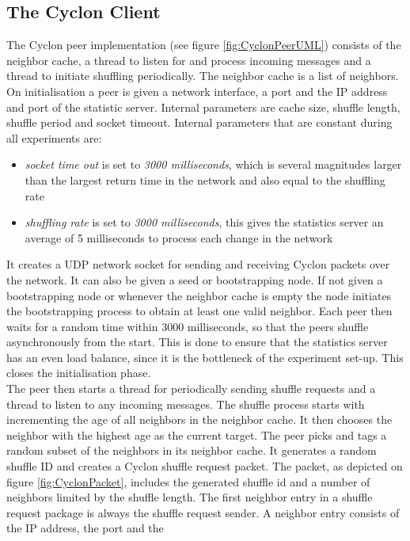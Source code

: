 \subsection{The Cyclon Client}
The Cyclon peer implementation (see figure \ref{fig:CyclonPeerUML}) consists
of the neighbor cache, a thread to listen for and process incoming messages and a thread to initiate shuffling
periodically. The neighbor cache is a list of neighbors. On initialisation a
peer is given a network interface, a port and the IP address and port of the
statistic server. Internal parameters are cache size, shuffle length, shuffle
period and socket timeout. Internal parameters that are constant during all
experiments are:
\begin{itemize}
  \item \emph{socket time out} is set to \emph{3000 milliseconds}, which is
  several magnitudes larger than the largest return time in the network and also
  equal to the shuffling rate
  \item \emph{shuffling rate} is set to \emph{3000 milliseconds}, this gives the
  statistics server an average of 5 milliseconds to process each change in the
  network
\end{itemize}
It creates a UDP network socket for sending and receiving Cyclon packets over
the network. It can also be given a seed or bootstrapping node. If not given a
bootstrapping node or whenever the neighbor cache is empty the node initiates
the bootstrapping process to obtain at least one valid neighbor. Each peer then
waits for a random time within 3000 milliseconds, so that the peers shuffle
asynchronously from the start. This is done to ensure that the statistics
server has an even load balance, since it is the bottleneck of the experiment
set-up. This closes the initialisation phase.\\
The peer then starts
a thread for periodically sending shuffle requests and a thread to listen to any incoming
messages. The shuffle process starts with incrementing the age of all neighbors
in the neighbor cache. It then chooses the neighbor with the highest age as the
current target. The peer picks and tags a random subset of the neighbors in its
neighbor cache. It generates a random shuffle ID and creates a Cyclon shuffle request
packet. The packet, as depicted on figure \ref{fig:CyclonPacket}, includes the
generated shuffle id and a number of neighbors limited by the shuffle length.
The first neighbor entry in a shuffle request package is always the shuffle
request sender. A neighbor entry consists of the IP address, the port and the
